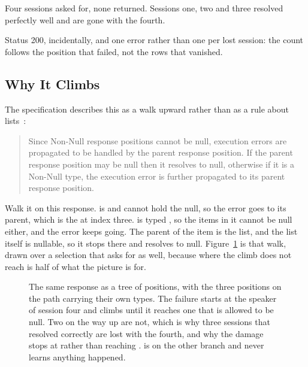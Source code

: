 %
Four sessions asked for, none returned. Sessions one, two and three resolved
perfectly well and are gone with the fourth.

%
Status 200, incidentally, and one error rather than one per lost session: the
count follows the position that failed, not the rows that vanished.

\subsection{Why It Climbs}

%
The specification describes this as a walk upward rather than as a
rule about lists~\autocite{graphqlspec2025}:

\begin{quote}
Since Non-Null response positions cannot be null, execution errors are
propagated to be handled by the parent response position. If the parent
response position may be null then it resolves to null, otherwise if it is a
Non-Null type, the execution error is further propagated to its parent
response position.
\end{quote}

%
Walk it on this response.  is  and cannot hold the
null, so the error goes to its parent, which is the  at index
three.  is typed \code{[Session!]}, so the items in it cannot be
null either, and the error keeps going. The parent of the item is the list, and
the list itself is nullable, so it stops there and  resolves to
null. Figure~\ref{fig:ch04-null-climbs} is that walk, drawn over a selection
that asks for  as well, because where the climb does not reach
is half of what the picture is for.

\begin{figure}
  \centering
  
  \caption{The same response as a tree of positions, with the three positions
  on the path carrying their own types. The failure starts at the speaker of
  session four and climbs until it reaches one that is allowed to be null. Two
  on the way up are not, which is why three sessions that resolved correctly
  are lost with the fourth, and why the damage stops at  rather
  than reaching .  is on the other branch and
  never learns anything happened.}
  \label{fig:ch04-null-climbs}
\end{figure}

